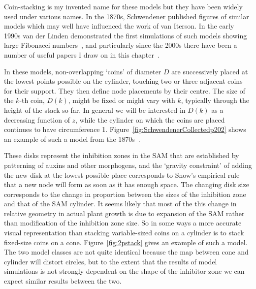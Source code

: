 Coin-stacking is my invented name for these models but they have been widely used under various names. In the 1870s, Schwendener published figures of similar models which may well have influenced the work of van Iterson. In the early 1990s van der Linden demonstrated the first simulations of such models showing large Fibonacci numbers~\cite{vanderlindenCreatingPhyllotaxisDislodgement1990}, and particularly since the 2000s there have been a number of  useful papers I draw on in this chapter~\autocite{atelaRhombicTilingsPrimordia2017,hottonPossibleActualPhyllotaxis2006,atelaGeometricDynamicEssence2011}. 

In these models,  non-overlapping `coins' of diameter $D$ are successively placed at the lowest points possible on the cylinder,  touching two or three adjacent coins for their support. They then define node placements by their centre. The size of the $k$-th coin, $D(k)$, might be fixed or might vary with $k$, typically through the height of the stack so far.  In general we will be interested in $D(k)$ as a decreasing function of $z$, while the cylinder on which the coins are placed continues to have circumference 1. Figure~\ref{fig:SchwendenerCollectedp202} shows an example of such a model from the 1870s~\autocite{schwendenerMechanischeTheorieBlattstellungen1878}.%

These disks represent the inhibition zones in the SAM that are established by patterning of auxins and other morphogens, and the `gravity constraint' of adding the new disk at the lowest possible place corresponds to Snow's empirical rule that a new node will form as soon as it has enough space. The changing disk size corresponds to the change in proportion between the sizes of the inhibition zone and that of the SAM cylinder. It seems likely that most of the this change in relative geometry in actual plant growth is due to expansion of the SAM rather than modification of the inhibition zone size. So in some ways a more accurate visual representation than stacking variable-sized coins on a cylinder is to stack fixed-size coins on a cone. Figure~\ref{fig:2pstack} gives an example of such a model. The two model classes are not quite identical because the map between cone and cylinder will distort circles, but to the extent that the results of model simulations is not strongly dependent on the shape of the inhibitor zone we can expect similar results between the two.

